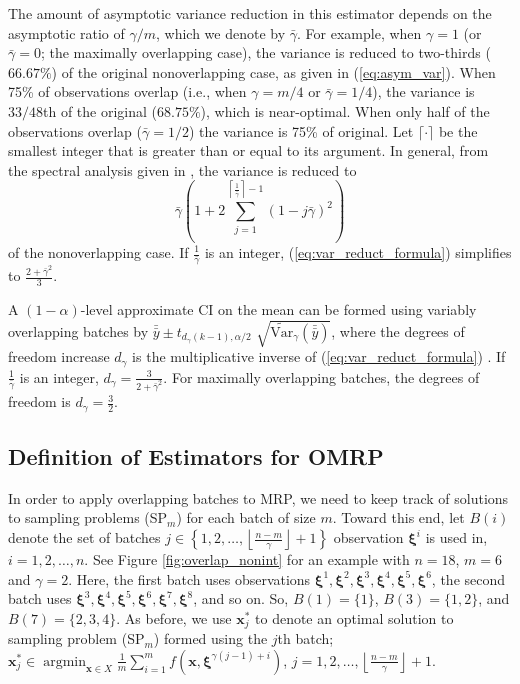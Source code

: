 \documentclass[12pt]{article}
\newcommand{\vartg}[1]{\widetilde{\mathrm{Var}}_\gamma \left( #1 \right)}
\newcommand{\x}{\mathbf{x}}
\newcommand{\xs}{\x^*}
\newcommand{\xit}{\boldsymbol{\xi}}
\newcommand{\xiti}{\xit^i}
\newcommand{\nb}{\left\lfloor\tfrac{n-m}{\gamma}\right\rfloor+1}
\newcommand{\gammab}{\bar{\gamma}}
\newcommand{\ogb}{\tfrac{1}{\gammab}}
\newcommand{\cogb}{\left\lceil\ogb\right\rceil}
\newcommand{\yb}{\bar{y}}
\newcommand{\ybb}{\bar{\yb}}
\DeclareMathOperator*{\argmin}{argmin}
\begin{document}
The amount of asymptotic variance reduction in this estimator depends on the asymptotic ratio of $\gamma/m$, which we denote by $\gammab$.  
For example, when $\gamma = 1$ (or $\gammab=0$; the maximally overlapping case), the variance is reduced to two-thirds ($66.67\%$) of the original nonoverlapping case, as given in (\ref{eq:asym_var}).  
When 75\% of observations overlap (i.e., when $\gamma = m/4$ or $\gammab = 1/4$), the variance is $33/48$th of the original ($68.75\%$), which is near-optimal.   
When only half of the observations overlap ($\gammab = 1/2$) the variance is 75\% of original.  
Let $\lceil \cdot \rceil$ be the smallest integer that is greater than or equal to its argument. 
In general, from the spectral analysis given in \citep{Welch1987}, the variance is reduced to
\begin{equation} \label{eq:var_reduct_formula}
	\gammab \left( 1 + 2 \sum_{j=1}^{\cogb-1} (1-j\gammab)^2 \right) %
\end{equation}
of the nonoverlapping case.  
If $\ogb$ is an integer, (\ref{eq:var_reduct_formula}) simplifies to $\frac{2+\gammab^2}{3}$.


A $(1-\alpha)$-level approximate CI on the mean can be formed using variably overlapping batches by $\ybb \pm t_{d_{\gamma}(k-1),\alpha/2}$ $\sqrt{\vartg{\ybb}}$, where the degrees of freedom increase $d_{\gamma}$ is the multiplicative inverse of (\ref{eq:var_reduct_formula}) \citep{Welch1987}.  
If $\ogb$ is an integer, $d_{\gamma} = \frac{3}{2+\gammab^2}$.  For maximally overlapping batches, the degrees of freedom is $d_{\gamma} = \frac{3}{2}$.
 

\subsection{Definition of Estimators for OMRP}

In order to apply overlapping batches to MRP, we need to keep track of solutions to sampling problems (SP$_m$) for each batch of size $m$.  
Toward this end, let $B(i)$ denote the set of batches $j \in \left\{1, 2, \dots, \nb \right\}$ observation $\xiti$ is used in, $i = 1, 2, \dots, n$.  
See Figure \ref{fig:overlap_nonint} for an example with $n=18$, $m = 6$ and $\gamma = 2$.  
Here, the first batch uses observations $\xit^1, \xit^2, \xit^3, \xit^4, \xit^5, \xit^6$, the second batch uses $\xit^3, \xit^4, \xit^5, \xit^6, \xit^7, \xit^8$, and so on.  
So, $B(1) = \{1\}$, $B(3) = \{1,2\}$, and $B(7)=\{2,3,4\}$.  
As before, we use $\xs_j$ to denote an optimal solution to sampling problem (SP$_m$) formed using the $j$th batch; $\xs_j \in \argmin_{\x \in X} \frac{1}{m} \sum_{i=1}^m f(\x,\xit^{\gamma(j-1) + i})$, $j = 1, 2, \dots, \nb$.
\end{document}
